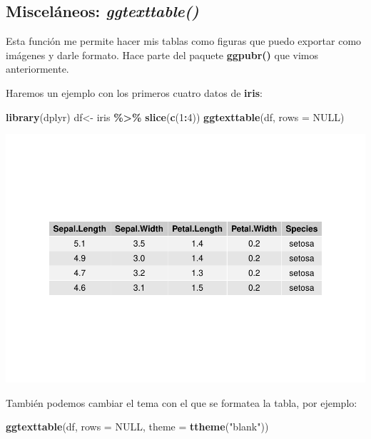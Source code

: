 \documentclass[
]{book}
\newenvironment{Shaded}{\begin{snugshade}}{\end{snugshade}}
\newcommand{\AttributeTok}[1]{\textcolor[rgb]{0.13,0.29,0.53}{#1}}
\newcommand{\ConstantTok}[1]{\textcolor[rgb]{0.56,0.35,0.01}{#1}}
\newcommand{\DecValTok}[1]{\textcolor[rgb]{0.00,0.00,0.81}{#1}}
\newcommand{\FunctionTok}[1]{\textcolor[rgb]{0.13,0.29,0.53}{\textbf{#1}}}
\newcommand{\NormalTok}[1]{#1}
\newcommand{\OtherTok}[1]{\textcolor[rgb]{0.56,0.35,0.01}{#1}}
\newcommand{\SpecialCharTok}[1]{\textcolor[rgb]{0.81,0.36,0.00}{\textbf{#1}}}
\newcommand{\StringTok}[1]{\textcolor[rgb]{0.31,0.60,0.02}{#1}}
\begin{document}
\subsection{\texorpdfstring{Misceláneos: \emph{ggtexttable()}}{Misceláneos: ggtexttable()}}\label{misceluxe1neos-ggtexttable}

Esta función me permite hacer mis tablas como figuras que puedo exportar como imágenes y darle formato.
Hace parte del paquete \textbf{ggpubr()} que vimos anteriormente.

Haremos un ejemplo con los primeros cuatro datos de \textbf{iris}:

\begin{Shaded}
\begin{Highlighting}[]
\FunctionTok{library}\NormalTok{(dplyr)}
\NormalTok{df}\OtherTok{\textless{}{-}}\NormalTok{ iris }\SpecialCharTok{\%\textgreater{}\%} \FunctionTok{slice}\NormalTok{(}\FunctionTok{c}\NormalTok{(}\DecValTok{1}\SpecialCharTok{:}\DecValTok{4}\NormalTok{))}
\FunctionTok{ggtexttable}\NormalTok{(df, }\AttributeTok{rows =} \ConstantTok{NULL}\NormalTok{)}
\end{Highlighting}
\end{Shaded}

\includegraphics{_main_files/figure-latex/unnamed-chunk-231-1.pdf}

También podemos cambiar el tema con el que se formatea la tabla, por ejemplo:

\begin{Shaded}
\begin{Highlighting}[]
\FunctionTok{ggtexttable}\NormalTok{(df, }\AttributeTok{rows =} \ConstantTok{NULL}\NormalTok{, }\AttributeTok{theme =} \FunctionTok{ttheme}\NormalTok{(}\StringTok{"blank"}\NormalTok{))}
\end{Highlighting}
\end{Shaded}
\end{document}
